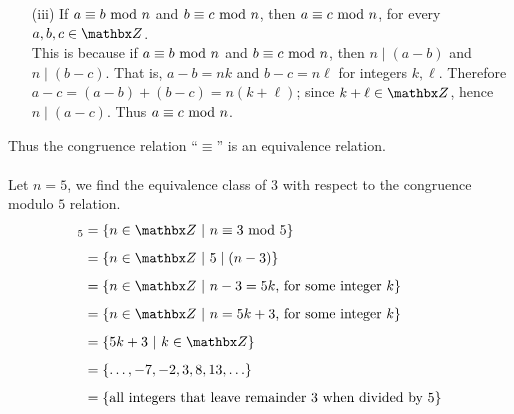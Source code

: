 \begin{example}
\begin{itemize}[itemsep=1em]
\item[(iii)] If $a \equiv b \text{ mod }{n}$ and $b \equiv c \text{ mod }{n}$, then $a \equiv c \text{ mod }{n}$, for every $a,b,c \in \zz$.\\[0.5em]
This is because if $a \equiv b \text{ mod }{n}$ and $b \equiv c \text{ mod }{n}$, then $n\mid (a - b)$ and $n \mid (b-c)$. That is, $a - b = nk$ and $b - c = n\ell$ for integers $k,\ell$. Therefore $a - c = (a - b) + (b - c) = n(k + \ell)$; since $k + \ell \in \zz$, hence $n\mid (a-c)$. Thus $a \equiv c \text{ mod }{n}$.
\end{itemize}
Thus the congruence relation ``$\equiv$'' is an equivalence relation.\\
\\
Let $n = 5$, we find the equivalence class of $3$ with respect to the congruence modulo $5$ relation.
\begin{align*}
[3]_5 &= \setp{n \in \zz}{n \equiv 3 \modar{5}}\\[0.5em]
 &= \setp{n \in \zz}{5\mid (n - 3)}\\[0.5em]
 &= \setp{n \in \zz}{n - 3 = 5k\text{, for some integer $k$}}\\[0.5em]
 &= \setp{n \in \zz}{n = 5k + 3\text{, for some integer $k$}}\\[0.5em]
 &= \setp{5k + 3}{k \in \zz}\\[0.5em]
 &= \set{\ldots,-7,-2,3,8,13,\ldots}\\[0.5em]
 &= \set{\text{all integers that leave remainder $3$ when divided by $5$}}
\end{align*}
\end{example}

\vspace*{1em}

